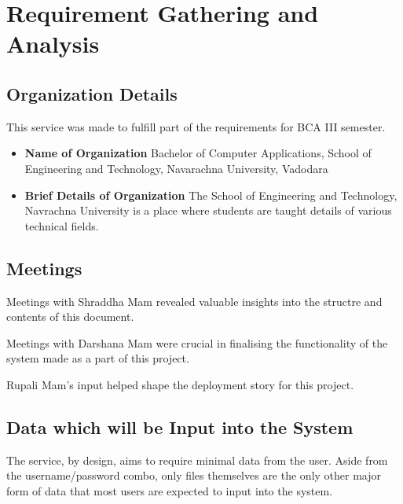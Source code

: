 \documentclass[12pt,a4paper]{report}
\begin{document}
\newpage
\chapter{Requirement Gathering and Analysis}\label{sec:requirement_gathering_and_analysis}
\section{Organization Details}\label{sec:organization_details}

This service was made to fulfill part of the requirements for BCA III semester.

\begin{itemize}
	\item \textbf{Name of Organization}
	      Bachelor of Computer Applications, School of Engineering and Technology, Navarachna University, Vadodara

	\item \textbf{Brief Details of Organization}
	      The School of Engineering and Technology, Navrachna University is a place where students are taught details of various technical fields.
\end{itemize}

\section{Meetings}\label{sec:meetings}
Meetings with Shraddha Mam revealed valuable insights into the structre and contents of this document.

Meetings with Darshana Mam were crucial in finalising the functionality of the system made as a part of this project.

Rupali Mam's input helped shape the deployment story for this project.
\section{Data which will be Input into the System}\label{sec:data_which_will_be_input_into_system}
The service, by design, aims to require minimal data from the user. Aside from the username/password combo, only files themselves are the only other major form of data that most users are expected to input into the system.
\end{document}
